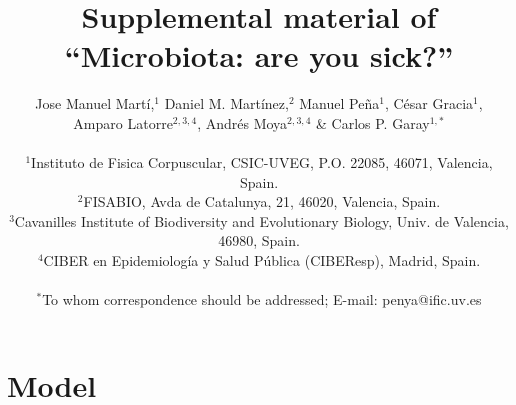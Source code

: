 \documentclass[12pt]{article}
\title{Supplemental material of ``Microbiota: are you sick?''}
\author
{Jose Manuel Mart\'i,$^{1}$ Daniel M. Mart\'inez,$^{2}$ Manuel Pe\~na$^{1}$, C\'esar Gracia$^{1}$, \\
Amparo Latorre$^{2,3,4}$, Andr\'es Moya$^{2,3,4}$ \& Carlos P. Garay$^{1,\ast}$\\
\\
\normalsize{$^{1}$Instituto de Fisica Corpuscular, CSIC-UVEG, P.O.  22085, 46071, Valencia, Spain.}\\
\normalsize{$^{2}$FISABIO, Avda de Catalunya, 21, 46020, Valencia, Spain.}\\
\normalsize{$^{3}$Cavanilles Institute of Biodiversity and Evolutionary Biology, Univ. de Valencia, 46980, Spain.}\\
\normalsize{$^{4}$CIBER en Epidemiolog\' ia y Salud P\'ublica (CIBEResp), Madrid, Spain.}\\
\\
\normalsize{$^\ast$To whom correspondence should be addressed; E-mail:  penya@ific.uv.es}
}
\date{}
\begin{document}
 


\baselineskip24pt


\maketitle 





\section*{Model} \label{sec:model}
\end{document}
